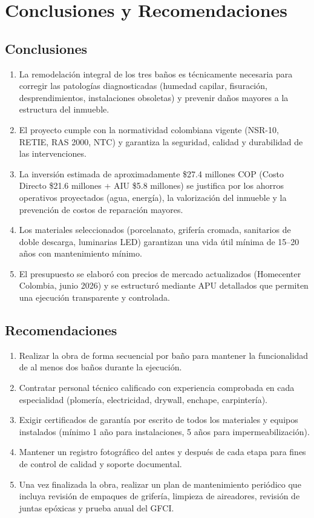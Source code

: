 ﻿\documentclass[12pt]{article}
\begin{document}
\section{Conclusiones y Recomendaciones}

\subsection{Conclusiones}

\begin{enumerate}[noitemsep]
  \item La remodelación integral de los tres baños es técnicamente necesaria para
  corregir las patologías diagnosticadas (humedad capilar, fisuración, desprendimientos, instalaciones
  obsoletas) y prevenir daños mayores a la estructura del inmueble.
  \item El proyecto cumple con la normatividad colombiana vigente (NSR-10, RETIE, RAS 2000, NTC)
  y garantiza la seguridad, calidad y durabilidad de las intervenciones.
  \item La inversi\'on estimada de aproximadamente \$27.4 millones COP (Costo Directo \$21.6 millones
  + AIU \$5.8 millones) se justifica por los ahorros
  operativos proyectados (agua, energía), la valorización del inmueble y la prevención
  de costos de reparación mayores.
  \item Los materiales seleccionados (porcelanato, grifería cromada,
  sanitarios de doble descarga, luminarias LED) garantizan una vida útil mínima de 15--20 años
  con mantenimiento mínimo.
  \item El presupuesto se elaboró con precios de mercado actualizados (Homecenter Colombia,
  junio 2026) y se estructuró mediante APU detallados que permiten una ejecución transparente y
  controlada.
\end{enumerate}

\subsection{Recomendaciones}

\begin{enumerate}[noitemsep]
  \item Realizar la obra de forma secuencial por baño para mantener la funcionalidad de al menos
  dos baños durante la ejecución.
  \item Contratar personal técnico calificado con experiencia comprobada en cada especialidad
  (plomería, electricidad, drywall, enchape, carpintería).
  \item Exigir certificados de garantía por escrito de todos los materiales y equipos instalados
  (mínimo 1 año para instalaciones, 5 años para impermeabilización).
  \item Mantener un registro fotográfico del antes y después de cada etapa para fines de
  control de calidad y soporte documental.
  \item Una vez finalizada la obra, realizar un plan de mantenimiento periódico que incluya
  revisión de empaques de grifería, limpieza de aireadores, revisión de juntas epóxicas
  y prueba anual del GFCI.
\end{enumerate}
\end{document}
